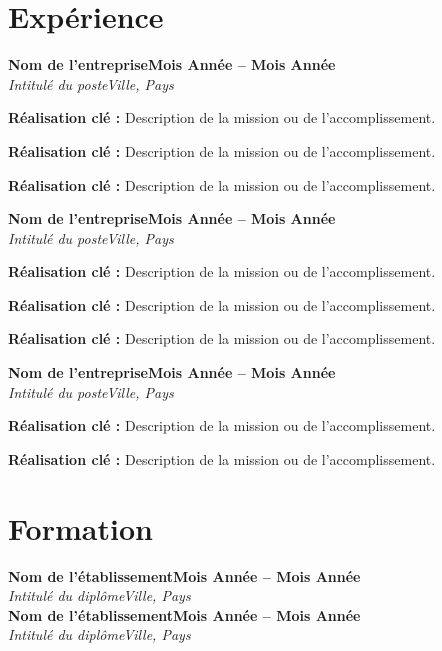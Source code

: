 \documentclass[letterpaper,10pt]{article}
\newcommand{\heading}[2]{
  \hspace{10pt}#1\hfill#2\\
}
\newcommand{\headingBf}[2]{
  \heading{\textbf{#1}}{\textbf{#2}}
}
\newcommand{\headingIt}[2]{
  \heading{\textit{#1}}{\textit{#2}}
}
\newenvironment{resume_list}{
  \vspace{-7pt}
  \begin{itemize}[itemsep=-2px, parsep=1pt, leftmargin=30pt]
}{
  \end{itemize}
}
\begin{document}
\section{Expérience}

\headingBf{Nom de l'entreprise}{Mois Année -- Mois Année}
\headingIt{Intitulé du poste}{Ville, Pays}
\begin{resume_list}
  \item \textbf{Réalisation clé :} Description de la mission ou de l'accomplissement.
  \item \textbf{Réalisation clé :} Description de la mission ou de l'accomplissement.
  \item \textbf{Réalisation clé :} Description de la mission ou de l'accomplissement.
\end{resume_list}

\headingBf{Nom de l'entreprise}{Mois Année -- Mois Année}
\headingIt{Intitulé du poste}{Ville, Pays}
\begin{resume_list}
  \item \textbf{Réalisation clé :} Description de la mission ou de l'accomplissement.
  \item \textbf{Réalisation clé :} Description de la mission ou de l'accomplissement.
  \item \textbf{Réalisation clé :} Description de la mission ou de l'accomplissement.
\end{resume_list}

\headingBf{Nom de l'entreprise}{Mois Année -- Mois Année}
\headingIt{Intitulé du poste}{Ville, Pays}
\begin{resume_list}
  \item \textbf{Réalisation clé :} Description de la mission ou de l'accomplissement.
  \item \textbf{Réalisation clé :} Description de la mission ou de l'accomplissement.
\end{resume_list}


\section{Formation}

\headingBf{Nom de l'établissement}{Mois Année -- Mois Année}
\headingIt{Intitulé du diplôme}{Ville, Pays}

\headingBf{Nom de l'établissement}{Mois Année -- Mois Année}
\headingIt{Intitulé du diplôme}{Ville, Pays}
\end{document}
